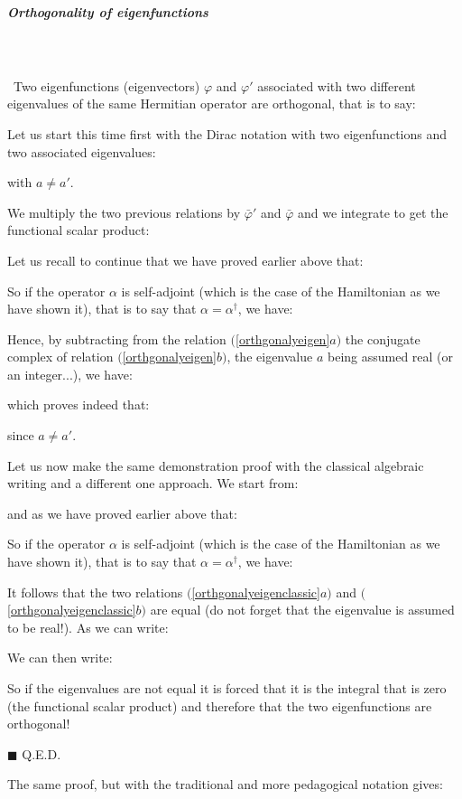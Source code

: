 	\subparagraph{Orthogonality of eigenfunctions}\mbox{}\\\\\
	Two eigenfunctions (eigenvectors) $\varphi$ and $\varphi'$ associated with two different eigenvalues of the same Hermitian operator are orthogonal, that is to say:
	
	\begin{dem}
	Let us start this time first with the Dirac notation with two eigenfunctions and two associated eigenvalues:
	
	with $a\neq a'$.
	
	We multiply the two previous relations by $\bar{\varphi}'$ and $\bar{\varphi}$ and we integrate to get the functional scalar product:
	
	Let us recall to continue that we have proved earlier above that:
	
	So if the operator $\alpha$ is self-adjoint (which is the case of the Hamiltonian as we have shown it), that is to say that $\alpha=\alpha^\dagger$, we have:
	
	Hence, by subtracting from the relation $($\ref{orthgonalyeigen}$a)$ the conjugate complex of relation $($\ref{orthgonalyeigen}$b)$, the eigenvalue $a$ being assumed real (or an integer...), we have:
	
	which proves indeed that:
	
	since $a\neq a'$.
	
	Let us now make the same demonstration proof with the classical algebraic writing and a different one approach. We start from:
	
	and as we have proved earlier above that:
	
	So if the operator $\alpha$ is self-adjoint (which is the case of the Hamiltonian as we have shown it), that is to say that $\alpha=\alpha^\dagger$, we have:
	
	It follows that the two relations $($\ref{orthgonalyeigenclassic}$a)$ and $($\ref{orthgonalyeigenclassic}$b)$ are equal (do not forget that the eigenvalue is assumed to be real!). As we can write:
	
	We can then write:
	
	So if the eigenvalues are not equal it is forced that it is the integral that is zero (the functional scalar product) and therefore that the two eigenfunctions are orthogonal!
	\begin{flushright}
		$\blacksquare$  Q.E.D.
	\end{flushright}
	\end{dem}
	The same proof, but with the traditional and more pedagogical notation gives:
	

